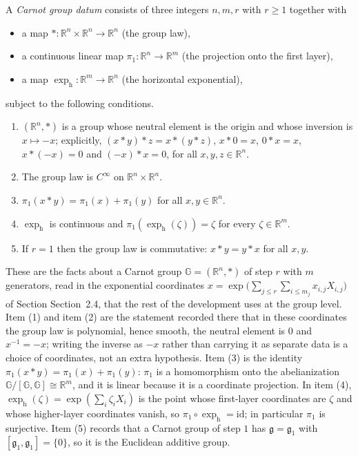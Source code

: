 \begin{definition}
A \emph{Carnot group datum} consists of three integers $n,m,r$ with $r\ge1$ together with
\begin{itemize}
\item a map $*:\mathbb R^n\times\mathbb R^n\to\mathbb R^n$ (the group law),
\item a continuous linear map $\pi_1:\mathbb R^n\to\mathbb R^m$ (the projection onto the
  first layer),
\item a map $\exp_{\mathrm h}:\mathbb R^m\to\mathbb R^n$ (the horizontal exponential),
\end{itemize}
subject to the following conditions.
\begin{enumerate}
\item $(\mathbb R^n,*)$ is a group whose neutral element is the origin and whose inversion
  is $x\mapsto-x$; explicitly, $(x*y)*z=x*(y*z)$, $x*0=x$, $0*x=x$, $x*(-x)=0$ and
  $(-x)*x=0$, for all $x,y,z\in\mathbb R^n$.
\item The group law is $C^\infty$ on $\mathbb R^n\times\mathbb R^n$.
\item $\pi_1(x*y)=\pi_1(x)+\pi_1(y)$ for all $x,y\in\mathbb R^n$.
\item $\exp_{\mathrm h}$ is continuous and $\pi_1(\exp_{\mathrm h}(\zeta))=\zeta$ for every
  $\zeta\in\mathbb R^m$.
\item If $r=1$ then the group law is commutative: $x*y=y*x$ for all $x,y$.
\end{enumerate}

These are the facts about a Carnot group $\mathbb G=(\mathbb R^n,*)$ of step $r$ with $m$
generators, read in the exponential coordinates
$x=\exp\big(\sum_{j\le r}\sum_{i\le m_j}x_{i,j}X_{i,j}\big)$ of Section Section~2.4,
that the rest of the development uses at the group level. Item (1) and item (2) are the
statement recorded there that in these coordinates the group law is polynomial, hence
smooth, the neutral element is $0$ and $x^{-1}=-x$; writing the inverse as $-x$ rather than
carrying it as separate data is a choice of coordinates, not an extra hypothesis. Item (3)
is the identity $\pi_1(x*y)=\pi_1(x)+\pi_1(y)$: $\pi_1$ is a homomorphism onto the
abelianization $\mathbb G/[\mathbb G,\mathbb G]\cong\mathbb R^m$, and it is linear because
it is a coordinate projection. In item (4), $\exp_{\mathrm h}(\zeta)=\exp(\sum_i\zeta_iX_i)$
is the point whose first-layer coordinates are $\zeta$ and whose higher-layer coordinates
vanish, so $\pi_1\circ\exp_{\mathrm h}=\mathrm{id}$; in particular $\pi_1$ is surjective.
Item (5) records that a Carnot group of step $1$ has $\mathfrak g=\mathfrak g_1$ with
$[\mathfrak g_1,\mathfrak g_1]=\{0\}$, so it is the Euclidean additive group.


\end{definition}
